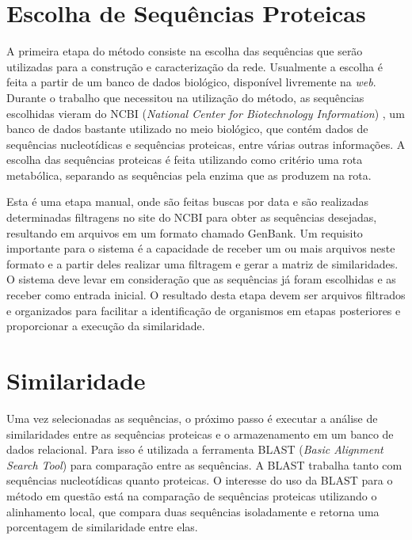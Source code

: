 \section{Escolha de Sequências Proteicas} \label{sec:escseq}

A primeira etapa do método consiste na escolha das sequências que serão utilizadas para a construção e caracterização da rede.
Usualmente a escolha é feita a partir de um banco de dados biológico, disponível livremente na \textit{web}. Durante o trabalho que necessitou na utilização
do método, as sequências escolhidas vieram do NCBI (\textit{National Center for Biotechnology Information}) \cite{ncbi},
um banco de dados bastante utilizado no
meio biológico, que contém dados de sequências
nucleotídicas e sequências proteicas, entre várias outras informações. A escolha das sequências proteicas é feita utilizando como critério
uma rota metabólica, separando as sequências pela enzima que as produzem na rota.


Esta é uma etapa manual, onde são feitas buscas por data e são realizadas determinadas filtragens no site do NCBI para obter as sequências desejadas, 
resultando em arquivos em um formato chamado GenBank. Um requisito importante para o sistema é a capacidade de receber um ou mais arquivos neste formato e
a partir deles
realizar uma filtragem e gerar a matriz de similaridades. O sistema deve levar em consideração que as sequências já foram escolhidas
e as receber como entrada inicial. O resultado desta etapa devem ser arquivos filtrados e organizados para facilitar a identificação de organismos em etapas
posteriores e proporcionar a execução da similaridade.

\section{Similaridade} \label{sec:similaridade}

Uma vez selecionadas as sequências, o próximo passo é executar a análise de similaridades entre as sequências proteicas e o armazenamento em um banco
de dados relacional. Para isso é utilizada a ferramenta BLAST (\textit{Basic Alignment Search Tool}) \cite{blast1997} para comparação entre as sequências.
A BLAST
trabalha tanto com sequências nucleotídicas quanto proteicas. O interesse do uso da BLAST para o método em questão está na comparação de sequências proteicas
utilizando o alinhamento local, que compara duas sequências isoladamente e retorna uma porcentagem de similaridade entre elas.

